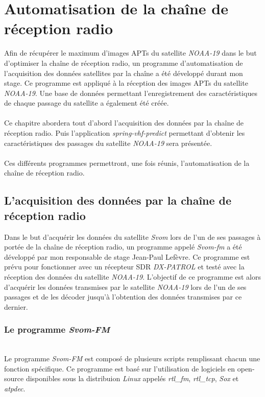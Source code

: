 \documentclass[12pt,fleqn]{book} %
\begin{document}
\part{Automatisation de la chaîne de réception radio}
Afin de récupérer le maximum d'images APTs du satellite \emph{NOAA-19} dans le but d'optimiser la chaîne de réception radio, un programme d'automatisation de l'acquisition des données satellites par la chaîne a été développé durant mon stage. Ce programme est appliqué à la réception des images APTs du satellite \emph{NOAA-19}. Une base de données permettant l'enregistrement des caractéristiques de chaque passage du satellite a également été créée.
~\\\\Ce chapitre abordera tout d'abord l'acquisition des données par la chaîne de réception radio. Puis l'application \emph{spring-vhf-predict} permettant d'obtenir les caractéristiques des passages du satellite \emph{NOAA-19} sera présentée. 
~\\\\Ces différents programmes permettront, une fois réunis, l'automatisation de la chaîne de réception radio.  
\chapter{L'acquisition des données par la chaîne de réception radio}
Dans le but d'acquérir les données du satellite \emph{Svom} lors de l'un de ses passages à portée de la chaîne de réception radio, un programme appelé \emph{Svom-fm} a été développé par mon responsable de stage Jean-Paul Lefèvre. Ce programme est prévu pour fonctionner avec un récepteur SDR \emph{DX-PATROL} et testé avec la réception des données du satellite \emph{NOAA-19}. L'objectif de ce programme est alors d'acquérir les données transmises par le satellite \emph{NOAA-19} lors de l'un de ses passages et de les décoder jusqu'à l'obtention des données transmises par ce dernier.
\section{Le programme \emph{Svom-FM}}
~\\\indent Le programme \emph{Svom-FM} est composé de plusieurs scripts remplissant chacun une fonction spécifique. Ce programme est basé sur l'utilisation de logiciels en open-source disponibles sous la distribuion \emph{Linux} appelés \emph{rtl\_fm}, \emph{rtl\_tcp}, \emph{Sox} et \emph{atpdec}.
\end{document}

